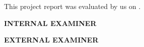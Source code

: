 \documentclass[12pt,a4paper]{report}
\theoremstyle{definition} %
\begin{document}
\vspace{2cm}

\noindent This project report was evaluated by us on \underline{\hspace{5cm}}.

\vspace{4cm}

\noindent\begin{minipage}[t]{0.48\textwidth}
\textbf{INTERNAL EXAMINER}
\end{minipage}%
\hfill
\begin{minipage}[t]{0.48\textwidth}
\raggedleft
\textbf{EXTERNAL EXAMINER}
\end{minipage}

	
	
\end{document}

